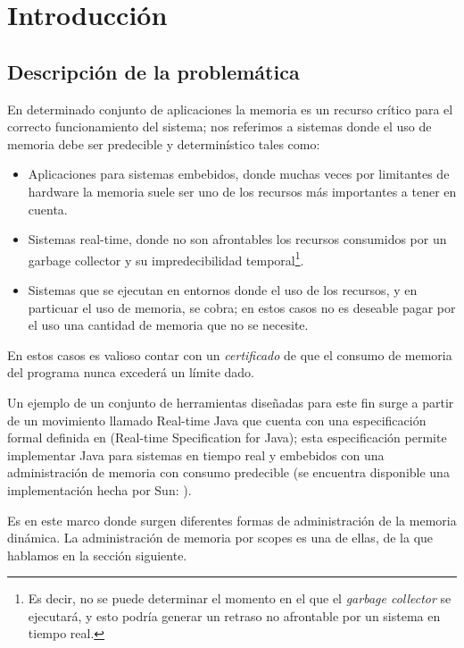 \documentclass[12pt,a4paper]{article}
\begin{document}
	\linespread{1}

	\newpage
	\tableofcontents

	\newpage
	\lstlistoflistings
	\listoffigures

	\newpage
	\setlength{\parskip}{\baselineskip}
	\section{Introducción}
		\subsection{Descripción de la problemática}
			En determinado conjunto de aplicaciones la memoria es un recurso crítico para el correcto funcionamiento del sistema; nos referimos a sistemas donde el uso de memoria debe ser predecible y determinístico tales como:

			\begin{itemize}
				\item Aplicaciones para sistemas embebidos, donde muchas veces por limitantes de hardware la memoria suele ser uno de los recursos más importantes a tener en cuenta.
				\item Sistemas real-time, donde no son afrontables los recursos consumidos por un garbage collector y su impredecibilidad temporal\footnote{Es decir, no se puede determinar el momento en el que el \textit{garbage collector} se ejecutará, y esto podría generar un retraso no afrontable por un sistema en tiempo real.}.
				\item Sistemas que se ejecutan en entornos donde el uso de los recursos, y en particuar el uso de memoria, se cobra; en estos casos no es deseable pagar por el uso una cantidad de memoria que no se necesite.
			\end{itemize}

			En estos casos es valioso contar con un \textit{certificado} de que el consumo de memoria del programa nunca excederá un límite dado.

			Un ejemplo de un conjunto de herramientas diseñadas para este fin surge a partir de un movimiento llamado Real-time Java que cuenta con una especificación formal definida en \cite{RTSJ} (Real-time Specification for Java); esta especificación permite implementar Java para sistemas en tiempo real y embebidos con una administración de memoria con consumo predecible (se encuentra disponible una implementación hecha por Sun: \cite{implSun}).

			Es en este marco donde surgen diferentes formas de administración de la memoria dinámica. La administración de memoria por scopes es una de ellas, de la que hablamos en la sección siguiente.
\end{document}
